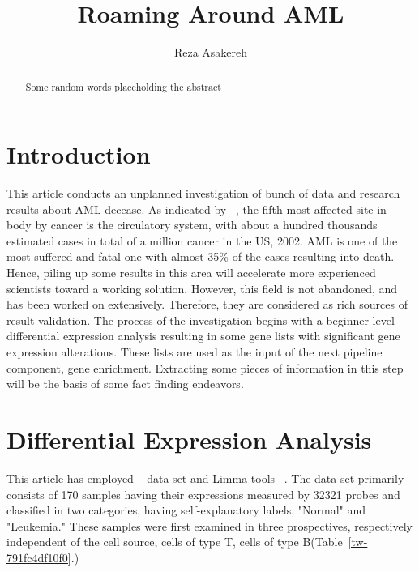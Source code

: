 \documentclass[3p,authoryear,preprint,12pt]{elsarticle}
\begin{document}
\begin{frontmatter}
	
\title{Roaming Around AML
}
    
\author[abb6a21433054]{Reza Asakereh}
    
\address[abb6a21433054]{CE Department\unskip, 
    Sharif University of Technology}
  

\begin{abstract}
 Some random words placeholding the abstract
\end{abstract}
\end{frontmatter}
    
\section{Introduction}
 This article conducts an unplanned investigation of bunch of data and research results about AML decease. As indicated by \unskip~\citet{544198:12418069}, the fifth most affected site in body by cancer is the circulatory system, with about a hundred thousands estimated cases in total of a million cancer in the US, 2002. AML is one of the most suffered and fatal one with almost 35\% of the cases resulting into death. Hence, piling up some results in this area will accelerate more experienced scientists toward a working solution. However, this field is not abandoned, and has been worked on extensively. Therefore, they are considered as rich sources of result validation. The process of the investigation begins with a beginner level differential expression analysis resulting in some gene lists with significant gene expression alterations. These lists are used as the input of the next pipeline component, gene enrichment. Extracting some pieces of information in this step will be the basis of some fact finding endeavors.


    
\section{Differential Expression Analysis}
This article has employed \unskip~\citet{544198:12421871} data set and Limma tools \unskip~\citet{544198:12421995}. The data set primarily consists of 170 samples having their expressions measured by 32321 probes and classified in two categories, having self-explanatory labels, "Normal" and "Leukemia." These samples were first examined in three prospectives, respectively independent of the cell source, cells of type T, cells of type B(Table~\ref{tw-791fc4df10f0}.)
\end{document}
